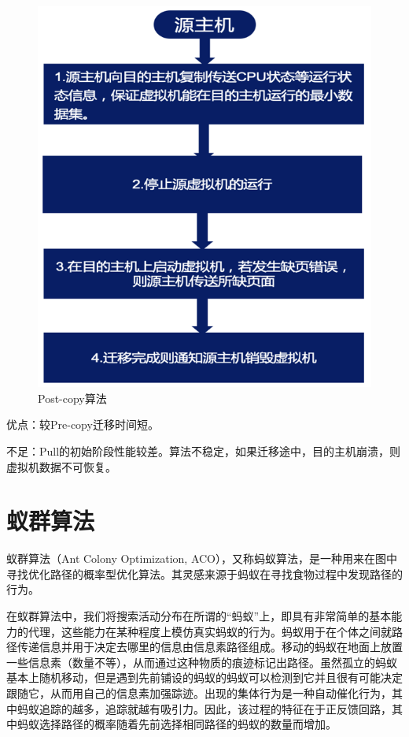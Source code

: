 \begin{figure}[ht]
  \centering
  \includegraphics{./Figure/IMG_Chap2_5.png}
  \caption{Post-copy算法}\label{Fig:chap2_5}
\end{figure}

优点：较Pre-copy迁移时间短。

不足：Pull的初始阶段性能较差。算法不稳定，如果迁移途中，目的主机崩溃，则虚拟机数据不可恢复。

\section{蚁群算法}
蚁群算法（Ant Colony Optimization, ACO），又称蚂蚁算法，是一种用来在图中寻找优化路径的概率型优化算法。其灵感来源于蚂蚁在寻找食物过程中发现路径的行为\cite{Maniezzo}。

在蚁群算法中，我们将搜索活动分布在所谓的“蚂蚁”上，即具有非常简单的基本能力的代理，这些能力在某种程度上模仿真实蚂蚁的行为。蚂蚁用于在个体之间就路径传递信息并用于决定去哪里的信息由信息素路径组成。移动的蚂蚁在地面上放置一些信息素（数量不等），从而通过这种物质的痕迹标记出路径。虽然孤立的蚂蚁基本上随机移动，但是遇到先前铺设的蚂蚁的蚂蚁可以检测到它并且很有可能决定跟随它，从而用自己的信息素加强踪迹。出现的集体行为是一种自动催化行为，其中蚂蚁追踪的越多，追踪就越有吸引力。因此，该过程的特征在于正反馈回路，其中蚂蚁选择路径的概率随着先前选择相同路径的蚂蚁的数量而增加。

